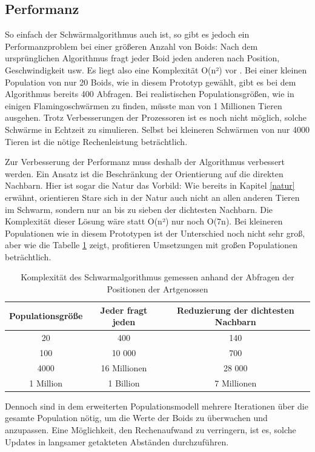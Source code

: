 \documentclass[draft=false
              ,paper=a4
              ,twoside=false
              ,fontsize=11pt
              ,headsepline
              ,BCOR10mm
              ,DIV11
              ,bibtotoc
              ,liststotoc
              ]{scrbook}
\begin{document}
\subsection{Performanz}\label{lahm}
So einfach der Schwärmalgorithmus auch ist, so gibt es jedoch ein Performanzproblem bei einer größeren Anzahl von Boids: Nach dem ursprünglichen Algorithmus fragt jeder Boid jeden anderen nach Position, Geschwindigkeit usw. Es liegt also eine Komplexität O(n²) vor \cite{reynolds87}. Bei einer kleinen Population von nur 20 Boids, wie in diesem Prototyp gewählt, gibt es bei dem Algorithmus bereits 400 Abfragen. Bei realistischen Populationsgrößen, wie in einigen Flamingoschwärmen zu finden, müsste man von 1 Millionen Tieren ausgehen. Trotz Verbesserungen der Prozessoren ist es noch nicht möglich, solche Schwärme in Echtzeit zu simulieren. Selbst bei kleineren Schwärmen von nur 4000 Tieren ist die nötige Rechenleistung beträchtlich.

Zur Verbesserung der Performanz muss deshalb der Algorithmus verbessert werden. Ein Ansatz ist die Beschränkung der Orientierung auf die direkten Nachbarn. Hier ist sogar die Natur das Vorbild: Wie bereits in Kapitel \ref{natur} erwähnt, orientieren Stare sich in der Natur auch nicht an allen anderen Tieren im Schwarm, sondern nur an bis zu sieben der dichtesten Nachbarn. Die Komplexität dieser Lösung wäre statt O(n²) nur noch O(7n). Bei kleineren Populationen wie in diesem Prototypen ist der Unterschied noch nicht sehr groß, aber wie die Tabelle \ref{komplexitaet} zeigt, profitieren Umsetzungen mit großen Populationen beträchtlich.

\begin{table}[h]
\centering
\begin{tabular}{c|c|c}
	Populationsgröße & Jeder fragt jeden & Reduzierung der dichtesten Nachbarn\\
	\hline
	20 & 400 & 140\\
	100 & 10 000 & 700\\
	4000 & 16 Millionen & 28 000\\
	1 Million & 1 Billion & 7 Millionen\\
\end{tabular}
\caption{Komplexität des Schwarmalgorithmus gemessen anhand der Abfragen der Positionen der Artgenossen}
\label{komplexitaet}
\end{table}

Dennoch sind in dem erweiterten Populationsmodell mehrere Iterationen über die gesamte Population nötig, um die Werte der Boids zu überwachen und anzupassen. Eine Möglichkeit, den Rechenaufwand zu verringern, ist es, solche Updates in langsamer getakteten Abständen durchzuführen.
\end{document}
